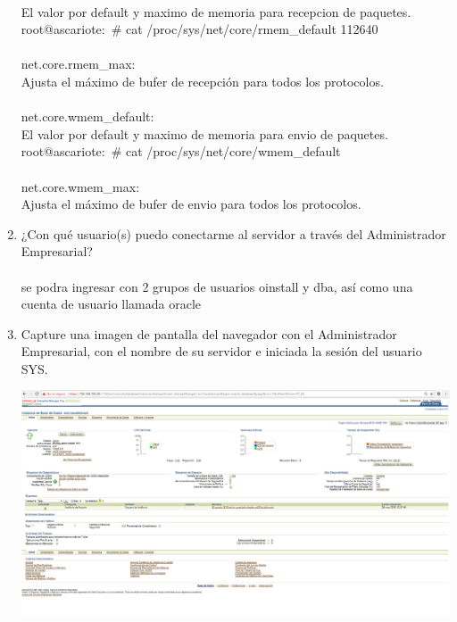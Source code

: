 \begin{enumerate}[1.]
\\El valor por default y maximo de memoria para recepcion de paquetes.
root@ascariote:~\# cat /proc/sys/net/core/rmem\_default
112640
\\
\\net.core.rmem\_max: 
\\Ajusta el máximo de bufer de recepción para todos los protocolos.
\\
\\net.core.wmem\_default: 
\\El valor por default y maximo de memoria para envio de paquetes.
root@ascariote:~\# cat /proc/sys/net/core/wmem\_default
\\
\\net.core.wmem\_max: 
\\Ajusta el máximo de bufer de envio para todos los protocolos.
\\










	
	\item ¿Con qué usuario(s) puedo conectarme al servidor a través del Administrador Empresarial?
	\\
	\\ se podra ingresar con 2 grupos de usuarios oinstall y dba, así como una cuenta de usuario llamada oracle

	\item Capture una imagen de pantalla del navegador con el Administrador Empresarial, con el nombre de su servidor e iniciada la sesión del usuario SYS.

	\begin{center}
	\includegraphics[width=15cm]{./Imagenes/Lab5-5_3} 
	\end{center}
	
	

\end{enumerate} 
